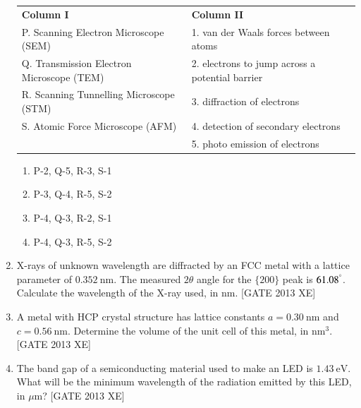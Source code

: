 \documentclass[journal,12pt,onecolumn]{IEEEtran}
\theoremstyle{remark}
\begin{document}
\begin{enumerate}
\begin{tabular}{ll}
\textbf{Column I} & \textbf{Column II} \\
P. Scanning Electron Microscope (SEM) & 1. van der Waals forces between atoms \\
Q. Transmission Electron Microscope (TEM) & 2. electrons to jump across a potential barrier \\
R. Scanning Tunnelling Microscope (STM) & 3. diffraction of electrons \\
S. Atomic Force Microscope (AFM) & 4. detection of secondary electrons \\
& 5. photo emission of electrons \\
\end{tabular}

\begin{enumerate}
\item P-2, Q-5, R-3, S-1
\item P-3, Q-4, R-5, S-2
\item P-4, Q-3, R-2, S-1
\item P-4, Q-3, R-5, S-2
\end{enumerate}
\item X-rays of unknown wavelength are diffracted by an FCC metal with a lattice parameter of $0.352\ \mathrm{nm}$. The measured $2\theta$ angle for the $\{200\}$ peak is $61.08^\degree$. Calculate the wavelength of the X-ray used, in nm. \underline{\hspace{2cm}}\hfill[GATE 2013 XE]

\item A metal with HCP crystal structure has lattice constants $a = 0.30\ \mathrm{nm}$ and $c = 0.56\ \mathrm{nm}$. Determine the volume of the unit cell of this metal, in $\mathrm{nm}^3$. \underline{\hspace{2cm}}\hfill[GATE 2013 XE]

\item The band gap of a semiconducting material used to make an LED is $1.43\ \mathrm{eV}$. What will be the minimum wavelength of the radiation emitted by this LED, in $\mu\mathrm{m}$? \underline{\hspace{2cm}}\hfill[GATE 2013 XE]


\end{enumerate}
\end{document}
